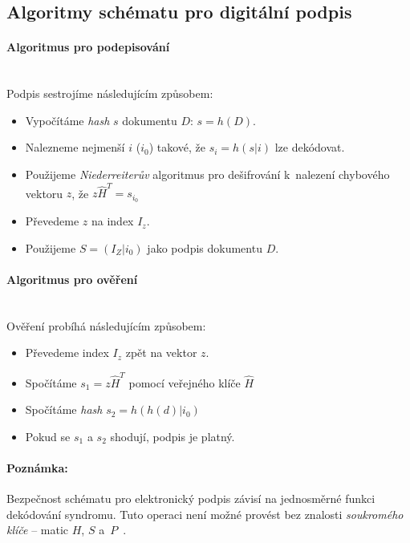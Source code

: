 \documentclass[thesis=M,czech,hidelinks]{FITthesis}[2012/06/26]
\newcommand{\0}{{\textcolor[gray]{0.75}{0}}}
\begin{document}
\subsection{Algoritmy schématu pro digitální podpis}

\paragraph{Algoritmus pro podepisování} \hfil \\
Podpis sestrojíme následujícím způsobem:

\begin{itemize}
    \item Vypočítáme \emph{hash} $s$ dokumentu $D$: $s = h(D)$.
    \item Nalezneme nejmenší $i$ ($i_0$) takové, že $s_i = h(s|i)$ lze dekódovat.
    \item Použijeme \emph{Niederreiterův} algoritmus pro dešifrování k~nalezení
        chybového vektoru $z$, že $z\hat{H}^T = s_{i_0}$
    \item Převedeme $z$ na index $I_z$.
    \item Použijeme $S=(I_Z|i_0)$ jako podpis dokumentu $D$.
\end{itemize}

\paragraph{Algoritmus pro ověření} \hfil \\
Ověření probíhá následujícím způsobem:

\begin{itemize}
    \item Převedeme index $I_z$ zpět na vektor $z$.
    \item Spočítáme $s_1 = z\hat{H}^T$ pomocí veřejného klíče $\hat{H}$
    \item Spočítáme \emph{hash} $s_2 = h(h(d)|i_0)$
    \item Pokud se $s_1$ a $s_2$ shodují, podpis je platný.
\end{itemize}

\paragraph{Poznámka:} Bezpečnost schématu pro elektronický podpis závisí na
jednosměrné funkci dekódování syndromu. Tuto operaci není možné provést bez
znalosti \emph{soukromého klíče} -- matic $H$, $S$
a~$P$~\cite{Niederreiter,XingLi}.
\end{document}
